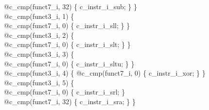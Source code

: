{\indent \hspace{\parindent} \hspace{\parindent} \hspace{\parindent}	@c\_cmp(funct7\_i, 32) \{ c\_instr\_i\_sub; \} \}\\%
\indent \hspace{\parindent} \hspace{\parindent} @c\_cmp(funct3\_i, 1) \{\\%
\indent \hspace{\parindent} \hspace{\parindent} \hspace{\parindent}	@c\_cmp(funct7\_i, 0) \{ c\_instr\_i\_sll; \} \}\\%
\indent \hspace{\parindent} \hspace{\parindent} @c\_cmp(funct3\_i, 2) \{\\%
\indent \hspace{\parindent} \hspace{\parindent} \hspace{\parindent}	@c\_cmp(funct7\_i, 0) \{ c\_instr\_i\_slt; \} \}\\%
\indent \hspace{\parindent} \hspace{\parindent} @c\_cmp(funct3\_i, 3) \{\\%
\indent \hspace{\parindent} \hspace{\parindent} \hspace{\parindent}	@c\_cmp(funct7\_i, 0)  \{ c\_instr\_i\_sltu; \} \}\\%
\indent \hspace{\parindent} \hspace{\parindent} @c\_cmp(funct3\_i, 4) \{ @c\_cmp(funct7\_i, 0)  \{ c\_instr\_i\_xor; \} \}\\%
\indent \hspace{\parindent} \hspace{\parindent} @c\_cmp(funct3\_i, 5) \{\\%
\indent \hspace{\parindent} \hspace{\parindent} \hspace{\parindent}	@c\_cmp(funct7\_i, 0)  \{ c\_instr\_i\_srl; \}\\%
\indent \hspace{\parindent} \hspace{\parindent} \hspace{\parindent}	@c\_cmp(funct7\_i, 32) \{ c\_instr\_i\_sra; \} \}\\%
}
